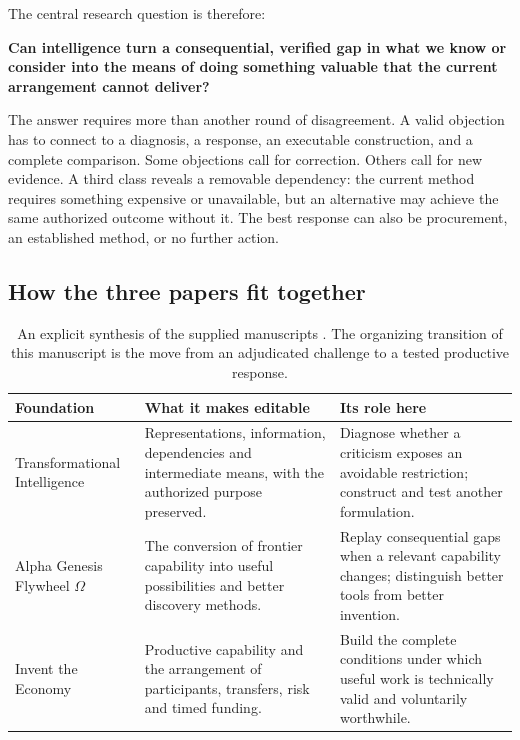The central research question is therefore:
\begin{thesisbox}
\textbf{Can intelligence turn a consequential, verified gap in what we know or consider into the means of doing something valuable that the current arrangement cannot deliver?}
\end{thesisbox}
The answer requires more than another round of disagreement. A valid objection has to connect to a diagnosis, a response, an executable construction, and a complete comparison. Some objections call for correction. Others call for new evidence. A third class reveals a removable dependency: the current method requires something expensive or unavailable, but an alternative may achieve the same authorized outcome without it. The best response can also be procurement, an established method, or no further action.

\subsection{How the three papers fit together}
\begin{table}[H]
\small
\begin{tabularx}{\textwidth}{P{1.48in}YY}
\toprule
\textbf{Foundation} & \textbf{What it makes editable} & \textbf{Its role here}\\
\midrule
Transformational Intelligence & Representations, information, dependencies and intermediate means, with the authorized purpose preserved. & Diagnose whether a criticism exposes an avoidable restriction; construct and test another formulation.\\
Alpha Genesis Flywheel $\Omega$ & The conversion of frontier capability into useful possibilities and better discovery methods. & Replay consequential gaps when a relevant capability changes; distinguish better tools from better invention.\\
Invent the Economy & Productive capability and the arrangement of participants, transfers, risk and timed funding. & Build the complete conditions under which useful work is technically valid and voluntarily worthwhile.\\
\bottomrule
\end{tabularx}
\caption{An explicit synthesis of the supplied manuscripts \citep{boucher_ti,boucher_genesis,boucher_economy}. The organizing transition of this manuscript is the move from an adjudicated challenge to a tested productive response.}
\end{table}

